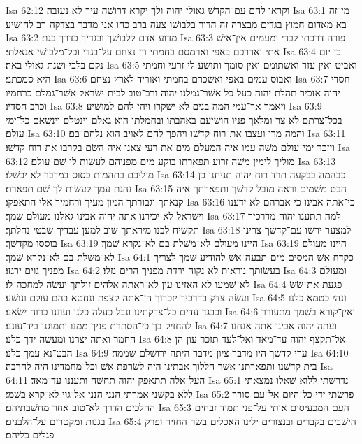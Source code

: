 Isa 62:12  וקראו להם עם־הקדשׁ גאולי יהוה ולך יקרא דרושׁה עיר לא נעזבה׃
Isa 63:1  מי־זה בא מאדום חמוץ בגדים מבצרה זה הדור בלבושׁו צעה ברב כחו אני מדבר בצדקה רב להושׁיע׃
Isa 63:2  מדוע אדם ללבושׁך ובגדיך כדרך בגת׃
Isa 63:3  פורה דרכתי לבדי ומעמים אין־אישׁ אתי ואדרכם באפי וארמסם בחמתי ויז נצחם על־בגדי וכל־מלבושׁי אגאלתי׃
Isa 63:4  כי יום נקם בלבי ושׁנת גאולי באה׃
Isa 63:5  ואביט ואין עזר ואשׁתומם ואין סומך ותושׁע לי זרעי וחמתי היא סמכתני׃
Isa 63:6  ואבוס עמים באפי ואשׁכרם בחמתי ואוריד לארץ נצחם׃
Isa 63:7  חסדי יהוה אזכיר תהלת יהוה כעל כל אשׁר־גמלנו יהוה ורב־טוב לבית ישׂראל אשׁר־גמלם כרחמיו וכרב חסדיו׃
Isa 63:8  ויאמר אך־עמי המה בנים לא ישׁקרו ויהי להם למושׁיע׃
Isa 63:9  בכל־צרתם לא צר ומלאך פניו הושׁיעם באהבתו ובחמלתו הוא גאלם וינטלם וינשׂאם כל־ימי עולם׃
Isa 63:10  והמה מרו ועצבו את־רוח קדשׁו ויהפך להם לאויב הוא נלחם־בם׃
Isa 63:11  ויזכר ימי־עולם משׁה עמו איה המעלם מים את רעי צאנו איה השׂם בקרבו את־רוח קדשׁו׃
Isa 63:12  מוליך לימין משׁה זרוע תפארתו בוקע מים מפניהם לעשׂות לו שׁם עולם׃
Isa 63:13  מוליכם בתהמות כסוס במדבר לא יכשׁלו׃
Isa 63:14  כבהמה בבקעה תרד רוח יהוה תניחנו כן נהגת עמך לעשׂות לך שׁם תפארת׃
Isa 63:15  הבט משׁמים וראה מזבל קדשׁך ותפארתך איה קנאתך וגבורתך המון מעיך ורחמיך אלי התאפקו׃
Isa 63:16  כי־אתה אבינו כי אברהם לא ידענו וישׂראל לא יכירנו אתה יהוה אבינו גאלנו מעולם שׁמך׃
Isa 63:17  למה תתענו יהוה מדרכיך תקשׁיח לבנו מיראתך שׁוב למען עבדיך שׁבטי נחלתך׃
Isa 63:18  למצער ירשׁו עם־קדשׁך צרינו בוססו מקדשׁך׃
Isa 63:19  היינו מעולם לא־משׁלת בם לא־נקרא שׁמך׃
Isa 63:19  היינו מעולם לא־משׁלת בם לא־נקרא שׁמך׃
Isa 64:1  כקדח אשׁ המסים מים תבעה־אשׁ להודיע שׁמך לצריך מפניך גוים ירגזו׃
Isa 64:2  בעשׂותך נוראות לא נקוה ירדת מפניך הרים נזלו׃
Isa 64:3  ומעולם לא־שׁמעו לא האזינו עין לא־ראתה אלהים זולתך יעשׂה למחכה־לו׃
Isa 64:4  פגעת את־שׂשׂ ועשׂה צדק בדרכיך יזכרוך הן־אתה קצפת ונחטא בהם עולם ונושׁע׃
Isa 64:5  ונהי כטמא כלנו וכבגד עדים כל־צדקתינו ונבל כעלה כלנו ועוננו כרוח ישׂאנו׃
Isa 64:6  ואין־קורא בשׁמך מתעורר להחזיק בך כי־הסתרת פניך ממנו ותמוגנו ביד־עוננו׃
Isa 64:7  ועתה יהוה אבינו אתה אנחנו החמר ואתה יצרנו ומעשׂה ידך כלנו׃
Isa 64:8  אל־תקצף יהוה עד־מאד ואל־לעד תזכר עון הן הבט־נא עמך כלנו׃
Isa 64:9  ערי קדשׁך היו מדבר ציון מדבר היתה ירושׁלם שׁממה׃
Isa 64:10  בית קדשׁנו ותפארתנו אשׁר הללוך אבתינו היה לשׂרפת אשׁ וכל־מחמדינו היה לחרבה׃
Isa 64:11  העל־אלה תתאפק יהוה תחשׁה ותעננו עד־מאד׃
Isa 65:1  נדרשׁתי ללוא שׁאלו נמצאתי ללא בקשׁני אמרתי הנני הנני אל־גוי לא־קרא בשׁמי׃
Isa 65:2  פרשׂתי ידי כל־היום אל־עם סורר ההלכים הדרך לא־טוב אחר מחשׁבתיהם׃
Isa 65:3  העם המכעיסים אותי על־פני תמיד זבחים בגנות ומקטרים על־הלבנים׃
Isa 65:4  הישׁבים בקברים ובנצורים ילינו האכלים בשׂר החזיר ופרק פגלים כליהם׃
